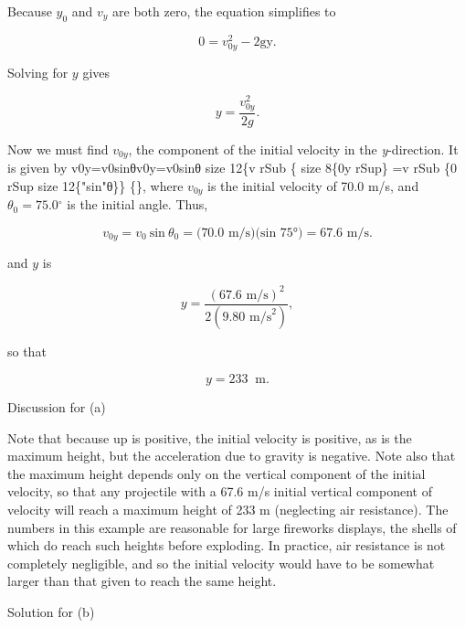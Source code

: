 \documentclass[
]{book}
\newenvironment{tinysection}{}{}
\begin{document}
Because \(y_{0}{}\) and \(v_{y}{}\) are both zero, the equation simplifies
to

\leavevmode\hypertarget{eip-42}{}%
\[{{0 = {v_{0y}^{2} - 2}}\text{gy.}}{}\]

Solving for \(y{}\) gives

\leavevmode\hypertarget{eip-256}{}%
\[{{y = \frac{v_{0y}^{2}}{2g}}\text{.}}{}\]

Now we must find \(v_{0y}{}\), the component of the initial velocity in
the \emph{y}-direction. It is given by {v0y=v0sinθv0y=v0sinθ size 12\{v rSub \{
size 8\{0y rSup\} =v rSub \{0 rSup size 12\{"sin"θ\}\} \{\}}, where
\(v_{0y}{}\) is the initial velocity of 70.0 m/s, and
\({\theta_{0} = 75.0{^\circ}}{}\) is the initial angle. Thus,

\leavevmode\hypertarget{eip-677}{}%
\[{{v_{0y} = v_{0}}\ \text{sin}\ {\theta_{0} = (}\text{70.0\ m/s})(\text{sin\ 75°}{) = \text{67.6\ m/s.}}}{}\]

and \(y{}\) is

\leavevmode\hypertarget{eip-512}{}%
\[{y = \frac{(\text{67}\text{.6\ m/s})^{2}}{2(9\text{.}\text{80\ m}\text{/s}^{2})}},\]

so that

\leavevmode\hypertarget{eip-310}{}%
\[{{y = \text{233}}\operatorname{}\text{m.}}{}\]

\begin{tinysection}

{Discussion for (a)}

\end{tinysection}

Note that because up is positive, the initial velocity is positive, as
is the maximum height, but the acceleration due to gravity is negative.
Note also that the maximum height depends only on the vertical component
of the initial velocity, so that any projectile with a 67.6 m/s initial
vertical component of velocity will reach a maximum height of 233 m
(neglecting air resistance). The numbers in this example are reasonable
for large fireworks displays, the shells of which do reach such heights
before exploding. In practice, air resistance is not completely
negligible, and so the initial velocity would have to be somewhat larger
than that given to reach the same height.

\begin{tinysection}

{Solution for (b)}

\end{tinysection}
\end{document}

